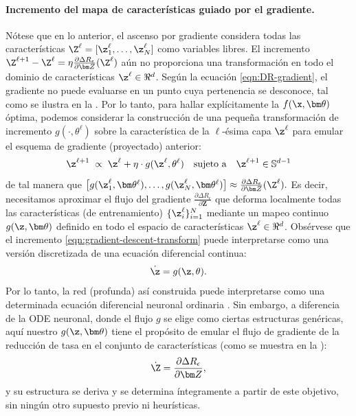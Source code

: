 \documentclass[../../book-main.tex]{subfiles}
\begin{document}
\paragraph{Incremento del mapa de características guiado por el gradiente.} Nótese que en lo
anterior, el ascenso por gradiente considera todas las características $\Z^{\ell} =
[\z^{\ell}_{1}, \dots, \z^{\ell}_{N}]$ como variables libres. El
incremento $\Z^{\ell+1} - \Z^{\ell} = \eta \frac{\partial \Delta
R_{\epsilon}}{\partial \bm Z}(\Z^\ell)$ aún no proporciona una
transformación en todo el dominio de características $\z^\ell \in \Re^d$.
Según la ecuación \eqref{eqn:DR-gradient}, el gradiente no puede
evaluarse en un punto cuya pertenencia se desconoce, tal como se ilustra en la
. Por lo tanto, para hallar explícitamente la
$f(\x,\bm  \theta)$ óptima, podemos considerar la construcción de una
pequeña transformación de incremento $g(\cdot, \theta^{\ell})$ sobre la característica de la
$\ell$-ésima capa $\z^\ell$ para emular el esquema de gradiente (proyectado) anterior:
\begin{equation}
    \z^{\ell + 1}   \; \propto \; \z^{\ell} + \eta\cdot  g(\z^{\ell},
    \theta^{\ell}) \quad \mbox{sujeto a} \quad \z^{\ell +1}
    \in \mathbb{S}^{d-1}
    \label{eqn:gradient-descent-transform}
\end{equation}
de tal manera que $\big[g(\z_1^{\ell}, \bm \theta^{\ell}), \ldots,
g(\z_N^{\ell}, \bm \theta^{\ell}) \big] \approx \frac{\partial \Delta
R_{\epsilon}}{\partial \bm Z}(\Z^\ell).$ Es decir, necesitamos
aproximar el flujo del gradiente $\frac{\partial \Delta
R_{\epsilon}}{\partial \bm Z}$ que deforma localmente todas las características (de entrenamiento)
$\{\z_i^\ell\}_{i=1}^N$ mediante un mapeo continuo $g(\z,\bm
\theta)$ definido en todo el espacio de características $\z^\ell \in \Re^d$.
Obsérvese que el incremento
\eqref{eqn:gradient-descent-transform} puede interpretarse como una versión discretizada de una
ecuación diferencial continua:
\begin{equation}
    \dot{\z} = g(\z, \theta).
\end{equation}
Por lo tanto, la red (profunda) así construida puede interpretarse como una
determinada ecuación diferencial neuronal ordinaria \cite{chen2018neural}. Sin embargo, a diferencia de la
ODE neuronal, donde el flujo $g$ se elige como ciertas estructuras genéricas, aquí
nuestro $g(\z, \bm\theta)$ tiene el propósito de emular el flujo de gradiente de la reducción de tasa
en el conjunto de características (como se muestra en la ):
\begin{equation*}
    \dot{\Z} = \frac{\partial \Delta R_{\epsilon}}{\partial \bm Z},
\end{equation*}
y su estructura se deriva y se determina íntegramente a partir de este
objetivo, sin ningún otro supuesto previo ni heurísticas.
\end{document}
